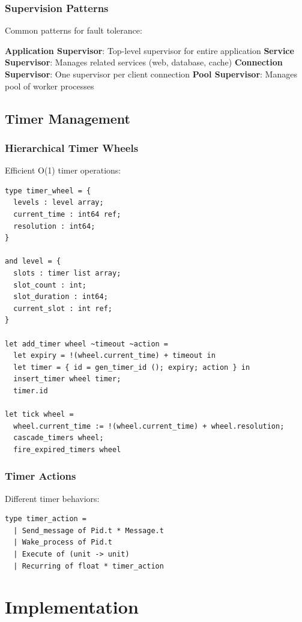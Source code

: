\documentclass[12pt,a4paper]{report}
\begin{document}
\subsection{Supervision Patterns}

Common patterns for fault tolerance:

\textbf{Application Supervisor}: Top-level supervisor for entire application
\textbf{Service Supervisor}: Manages related services (web, database, cache)
\textbf{Connection Supervisor}: One supervisor per client connection
\textbf{Pool Supervisor}: Manages pool of worker processes

\section{Timer Management}

\subsection{Hierarchical Timer Wheels}

Efficient O(1) timer operations:

\begin{lstlisting}
type timer_wheel = {
  levels : level array;
  current_time : int64 ref;
  resolution : int64;
}

and level = {
  slots : timer list array;
  slot_count : int;
  slot_duration : int64;
  current_slot : int ref;
}

let add_timer wheel ~timeout ~action =
  let expiry = !(wheel.current_time) + timeout in
  let timer = { id = gen_timer_id (); expiry; action } in
  insert_timer wheel timer;
  timer.id

let tick wheel =
  wheel.current_time := !(wheel.current_time) + wheel.resolution;
  cascade_timers wheel;
  fire_expired_timers wheel
\end{lstlisting}

\subsection{Timer Actions}

Different timer behaviors:

\begin{lstlisting}
type timer_action =
  | Send_message of Pid.t * Message.t
  | Wake_process of Pid.t  
  | Execute of (unit -> unit)
  | Recurring of float * timer_action
\end{lstlisting}

\chapter{Implementation}
\end{document}
